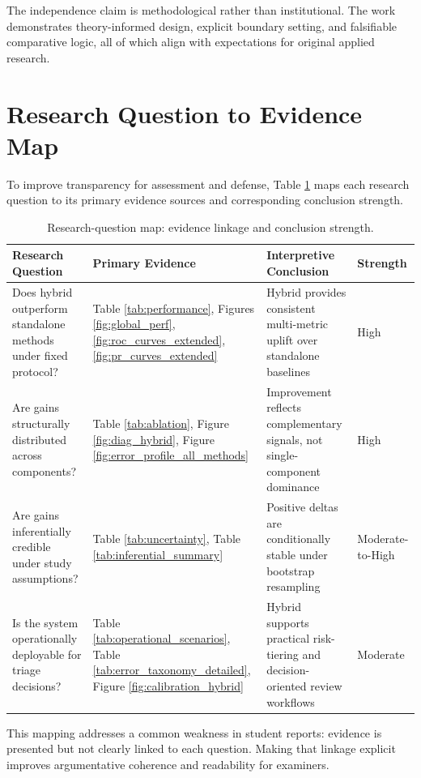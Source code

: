 \documentclass[12pt,a4paper]{report}
\begin{document}
The independence claim is methodological rather than institutional. The work demonstrates theory-informed design, explicit boundary setting, and falsifiable comparative logic, all of which align with expectations for original applied research.

\section{Research Question to Evidence Map}
To improve transparency for assessment and defense, Table \ref{tab:rq_evidence_map} maps each research question to its primary evidence sources and corresponding conclusion strength.

\begin{table}[H]
\caption{Research-question map: evidence linkage and conclusion strength.}
\label{tab:rq_evidence_map}
\begin{tabular}{p{}p{}p{}p{}}
\toprule
\textbf{Research Question} & \textbf{Primary Evidence} & \textbf{Interpretive Conclusion} & \textbf{Strength} \\
\midrule
Does hybrid outperform standalone methods under fixed protocol? & Table \ref{tab:performance}, Figures \ref{fig:global_perf}, \ref{fig:roc_curves_extended}, \ref{fig:pr_curves_extended} & Hybrid provides consistent multi-metric uplift over standalone baselines & High \\
Are gains structurally distributed across components? & Table \ref{tab:ablation}, Figure \ref{fig:diag_hybrid}, Figure \ref{fig:error_profile_all_methods} & Improvement reflects complementary signals, not single-component dominance & High \\
Are gains inferentially credible under study assumptions? & Table \ref{tab:uncertainty}, Table \ref{tab:inferential_summary} & Positive deltas are conditionally stable under bootstrap resampling & Moderate-to-High \\
Is the system operationally deployable for triage decisions? & Table \ref{tab:operational_scenarios}, Table \ref{tab:error_taxonomy_detailed}, Figure \ref{fig:calibration_hybrid} & Hybrid supports practical risk-tiering and decision-oriented review workflows & Moderate \\
\bottomrule
\end{tabular}
\end{table}

This mapping addresses a common weakness in student reports: evidence is presented but not clearly linked to each question. Making that linkage explicit improves argumentative coherence and readability for examiners.
\end{document}
